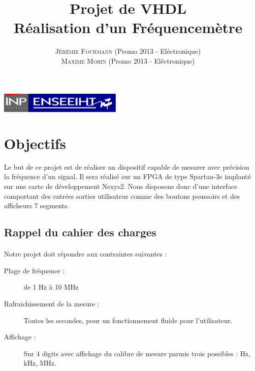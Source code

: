 \documentclass[a4paper,11pt]{article}
\title{\textbf{ \huge{Projet de VHDL}}  \\{\Large Réalisation d'un Fréquencemètre}}
\author{
\textsc{Jérémie Fourmann} (Promo 2013 - Eléctronique)\\ %
\textsc{Maxime Morin} (Promo 2013 - Eléctronique)\\ %
}
\begin{document}
\pagestyle{plain}

\maketitle
\begin{center}
\includegraphics[width=6cm]{inp-enseeiht.pdf}   
\end{center}

\vspace{1cm}
\renewcommand{\contentsname}{Plan}
\tableofcontents
\vspace{2cm}

\newpage
\section{Objectifs}
Le but de ce projet est de réaliser un dispositif capable de mesurer avec précision la fréquence d'un signal.
Il sera réalisé sur un FPGA de type Spartan-3e implanté sur une carte de développement Nexys2.
Nous disposons donc d'une interface comportant des entrées sorties utilisateur comme des boutons poussoirs et des 
afficheurs 7 segments.

\subsection{Rappel du cahier des charges}

\paragraph{} Notre projet doit répondre aux contraintes suivantes :

\begin{description}
\item[Plage de fréquence : ] de 1 Hz à 10 MHz
\item[Rafraichissement de la mesure :] Toutes les secondes, pour un fonctionnement fluide pour l'utilisateur.
\item[Affichage : ] Sur 4 digits avec affichage du calibre de mesure parmis trois possibles : Hz, kHz, MHz.
\end{description}
\end{document}
